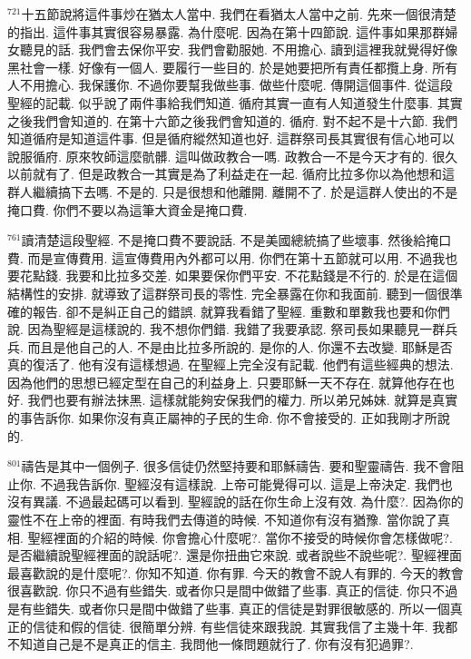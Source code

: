 \documentclass{book}
\begin{document}
$^{721}$十五節說將這件事炒在猶太人當中.
我們在看猶太人當中之前.
先來一個很清楚的指出.
這件事其實很容易暴露.
為什麼呢.
因為在第十四節說.
這件事如果那群婦女聽見的話.
我們會去保你平安.
我們會勸服她.
不用擔心.
讀到這裡我就覺得好像黑社會一樣.
好像有一個人.
要履行一些目的.
於是她要把所有責任都攬上身.
所有人不用擔心.
我保護你.
不過你要幫我做些事.
做些什麼呢.
傳開這個事件.
從這段聖經的記載.
似乎說了兩件事給我們知道.
循府其實一直有人知道發生什麼事.
其實之後我們會知道的.
在第十六節之後我們會知道的.
循府.
對不起不是十六節.
我們知道循府是知道這件事.
但是循府縱然知道也好.
這群祭司長其實很有信心地可以說服循府.
原來牧師這麼骯髒.
這叫做政教合一嗎.
政教合一不是今天才有的.
很久以前就有了.
但是政教合一其實是為了利益走在一起.
循府比拉多你以為他想和這群人繼續搞下去嗎.
不是的.
只是很想和他離開.
離開不了.
於是這群人使出的不是掩口費.
你們不要以為這筆大資金是掩口費.

$^{761}$讀清楚這段聖經.
不是掩口費不要說話.
不是美國總統搞了些壞事.
然後給掩口費.
而是宣傳費用.
這宣傳費用內外都可以用.
你們在第十五節就可以用.
不過我也要花點錢.
我要和比拉多交差.
如果要保你們平安.
不花點錢是不行的.
於是在這個結構性的安排.
就導致了這群祭司長的零性.
完全暴露在你和我面前.
聽到一個很準確的報告.
卻不是糾正自己的錯誤.
就算我看錯了聖經.
重數和單數我也要和你們說.
因為聖經是這樣說的.
我不想你們錯.
我錯了我要承認.
祭司長如果聽見一群兵兵.
而且是他自己的人.
不是由比拉多所說的.
是你的人.
你還不去改變.
耶穌是否真的復活了.
他有沒有這樣想過.
在聖經上完全沒有記載.
他們有這些經典的想法.
因為他們的思想已經定型在自己的利益身上.
只要耶穌一天不存在.
就算他存在也好.
我們也要有辦法抹黑.
這樣就能夠安保我們的權力.
所以弟兄姊妹.
就算是真實的事告訴你.
如果你沒有真正屬神的子民的生命.
你不會接受的.
正如我剛才所說的.

$^{801}$禱告是其中一個例子.
很多信徒仍然堅持要和耶穌禱告.
要和聖靈禱告.
我不會阻止你.
不過我告訴你.
聖經沒有這樣說.
上帝可能覺得可以.
這是上帝決定.
我們也沒有異議.
不過最起碼可以看到.
聖經說的話在你生命上沒有效.
為什麼?.
因為你的靈性不在上帝的裡面.
有時我們去傳道的時候.
不知道你有沒有猶豫.
當你說了真相.
聖經裡面的介紹的時候.
你會擔心什麼呢?.
當你不接受的時候你會怎樣做呢?.
是否繼續說聖經裡面的說話呢?.
還是你扭曲它來說.
或者說些不說些呢?.
聖經裡面最喜歡說的是什麼呢?.
你知不知道.
你有罪.
今天的教會不說人有罪的.
今天的教會很喜歡說.
你只不過有些錯失.
或者你只是間中做錯了些事.
真正的信徒.
你只不過是有些錯失.
或者你只是間中做錯了些事.
真正的信徒是對罪很敏感的.
所以一個真正的信徒和假的信徒.
很簡單分辨.
有些信徒來跟我說.
其實我信了主幾十年.
我都不知道自己是不是真正的信主.
我問他一條問題就行了.
你有沒有犯過罪?.
\end{document}
